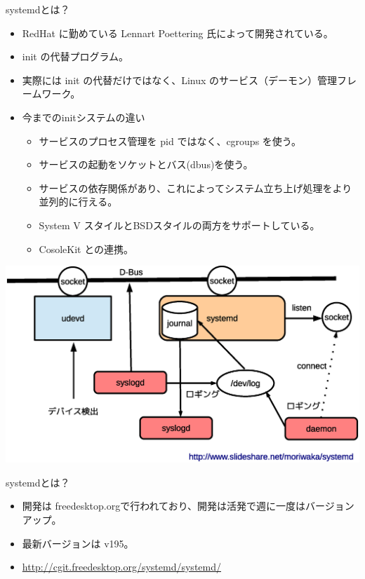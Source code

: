 \begin{frame}{systemdとは？}

\begin{itemize}
\item RedHat に勤めている Lennart Poettering 氏によって開発されている。
\item init の代替プログラム。
\item 実際には init の代替だけではなく、Linux のサービス（デーモン）管理フレームワーク。
\item 今までのinitシステムの違い
  \begin{itemize}
  \item サービスのプロセス管理を pid ではなく、cgroups を使う。
  \item サービスの起動をソケットとバス(dbus)を使う。
  \item サービスの依存関係があり、これによってシステム立ち上げ処理をより並列的に行える。
  \item System V スタイルとBSDスタイルの両方をサポートしている。
  \item CosoleKit との連携。
  \end{itemize}
\end{itemize}

\end{frame}


\begin{frame}
\includegraphics[width=1\hsize]{image201211/systemd-relation.eps}
\end{frame}

\begin{frame}{systemdとは？}

\begin{itemize}
\item 開発は freedesktop.orgで行われており、開発は活発で週に一度はバージョンアップ。
\item 最新バージョンは v195。
\item \url{http://cgit.freedesktop.org/systemd/systemd/}
\end{itemize}

\end{frame}


